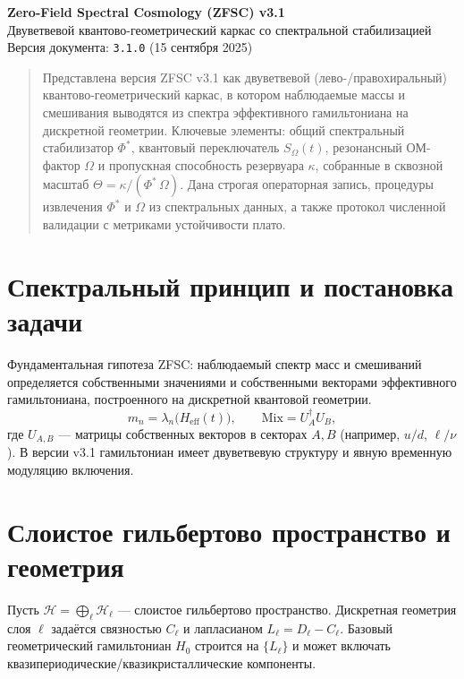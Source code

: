 \documentclass[a4paper,12pt]{article}
\def\Omega{Ω}%
\def\Theta{Θ}%
\def\Phi{Φ}%
\begin{document}
\begin{center}
{\Large \textbf{Zero-Field Spectral Cosmology (ZFSC) v3.1}}\\[4pt]
{\large Двуветвевой квантово-геометрический каркас со спектральной стабилизацией}\\[8pt]
Версия документа: \texttt{3.1.0} \quad (15 сентября 2025)
\end{center}

\begin{abstract}
Представлена версия ZFSC v3.1 как двуветвевой (лево-/правохиральный) квантово-геометрический каркас, в котором наблюдаемые массы и смешивания выводятся из спектра эффективного гамильтониана на дискретной геометрии. 
Ключевые элементы: общий спектральный стабилизатор $\Phi^*$, квантовый переключатель $S_{\Omega}(t)$, резонансный ОМ-фактор $\Omega$ и пропускная способность резервуара $\kappa$, собранные в сквозной масштаб $\Theta=\kappa/(\Phi^*\,\Omega)$. 
Дана строгая операторная запись, процедуры извлечения $\Phi^*$ и $\Omega$ из спектральных данных, а также протокол численной валидации с метриками устойчивости плато.
\end{abstract}

\tableofcontents

\section{Спектральный принцип и постановка задачи}
Фундаментальная гипотеза ZFSC: наблюдаемый спектр масс и смешиваний определяется собственными значениями и собственными векторами эффективного гамильтониана, построенного на дискретной квантовой геометрии.
\begin{equation}
m_n = \lambda_n\!\big(H_{\mathrm{eff}}(t)\big),\qquad 
\mathrm{Mix} = U_A^\dagger U_B,
\end{equation}
где $U_{A,B}$ --- матрицы собственных векторов в секторах $A,B$ (например, $u/d$, $\ell/\nu$). В версии v3.1 гамильтониан имеет двуветвевую структуру и явную временную модуляцию включения.

\section{Слоистое гильбертово пространство и геометрия}
Пусть $\mathcal H=\bigoplus_{\ell}\mathcal H_\ell$ --- слоистое гильбертово пространство. 
Дискретная геометрия слоя $\ell$ задаётся связностью $C_\ell$ и лапласианом $L_\ell=D_\ell-C_\ell$.
Базовый геометрический гамильтониан $H_0$ строится на $\{L_\ell\}$ и может включать квазипериодические/квазикристаллические компоненты.
\end{document}
